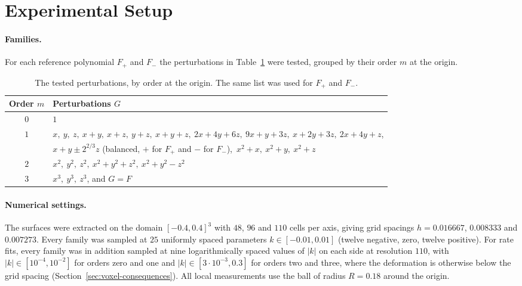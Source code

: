 \documentclass[12pt, a4paper, oneside]{book}
\theoremstyle{plain}
\theoremstyle{definition}
\theoremstyle{remark}
\begin{document}
\section{Experimental Setup}
\label{sec:setup}

\paragraph{Families.}
For each reference polynomial $F_+$ and $F_-$ the perturbations in
Table~\ref{tab:perturbations} were tested, grouped by their order $m$ at the
origin.

\begin{table}[!h]
\centering
\small
\begin{tabular}{c l}
\toprule
Order $m$ & Perturbations $G$ \\
\midrule
$0$ & $1$ \\
$1$ & $x,\ y,\ z,\ x+y,\ x+z,\ y+z,\ x+y+z,\ 2x+4y+6z,\ 9x+y+3z,\ x+2y+3z,\ 2x+4y+z$, \\
    & $x+y\pm2^{2/3}z$ (balanced, $+$ for $F_+$ and $-$ for $F_-$),\ $x^2+x,\ x^2+y,\ x^2+z$ \\
$2$ & $x^2,\ y^2,\ z^2,\ x^2+y^2+z^2,\ x^2+y^2-z^2$ \\
$3$ & $x^3,\ y^3,\ z^3$, and $G=F$ \\
\bottomrule
\end{tabular}
\caption[Tested perturbations]{The tested perturbations, by order at the
origin. The same list was used for $F_+$ and $F_-$.}
\label{tab:perturbations}
\end{table}

\paragraph{Numerical settings.}
The surfaces were extracted on the domain $[-0.4,0.4]^3$ with $48$, $96$ and
$110$ cells per axis, giving grid spacings $h=0.016667$, $0.008333$ and
$0.007273$. Every family was sampled at $25$ uniformly spaced parameters
$k\in[-0.01,0.01]$ (twelve negative, zero, twelve positive). For rate fits, every
family was in addition sampled at nine logarithmically spaced values of $|k|$ on
each side at resolution $110$, with $|k|\in[10^{-4},10^{-2}]$ for orders zero and
one and $|k|\in[3\cdot10^{-3},0.3]$ for orders two and three, where the
deformation is otherwise below the grid spacing
(Section~\ref{sec:voxel-consequences}). All local measurements use the ball of
radius $R=0.18$ around the origin.
\end{document}
